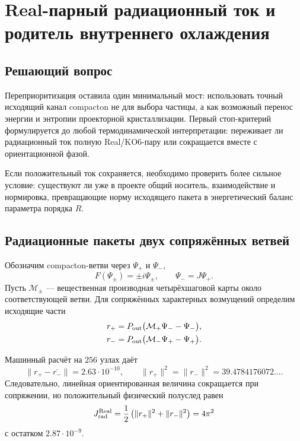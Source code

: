 \chapter{Real-парный радиационный ток и родитель внутреннего охлаждения}
\label{ch:v6-spectral-transition-real-pair-radiative-cooling-parent-gate}

\section{Решающий вопрос}

Переприоритизация оставила один минимальный мост: использовать точный
исходящий канал compacton не для выбора частицы, а как возможный перенос
энергии и энтропии проекторной кристаллизации. Первый стоп-критерий
формулируется до любой термодинамической интерпретации: переживает ли
радиационный ток полную Real/KO6-пару или сокращается вместе с
ориентационной фазой.

Если положительный ток сохраняется, необходимо проверить более сильное
условие: существуют ли уже в проекте общий носитель, взаимодействие и
нормировка, превращающие норму исходящего пакета в энергетический баланс
параметра порядка $R$.

\section{Радиационные пакеты двух сопряжённых ветвей}

Обозначим compacton-ветви через $\Psi_+$ и $\Psi_-$,
\begin{equation}
 F(\Psi_\pm)=\pm i\Psi_\pm,
 \qquad
 \Psi_-=J\Psi_+.
\end{equation}
Пусть $\mathcal M_\pm$ --- вещественная производная четырёхшаговой карты
около соответствующей ветви. Для сопряжённых характерных возмущений
определим исходящие части
\begin{align}
 r_+&=P_{\rm out}\bigl(\mathcal M_+\Psi_- -\Psi_-\bigr),\\
 r_-&=P_{\rm out}\bigl(\mathcal M_-\Psi_+ -\Psi_+\bigr).
 \label{eq:v6-real-pair-radiation-packets}
\end{align}

Машинный расчёт на $256$ узлах даёт
\begin{equation}
 \|r_+-\overline{r_-}\|=2.63\cdot10^{-10},
 \qquad
 \|r_+\|^2=\|r_-\|^2
 =39.4784176072\ldots.
\end{equation}
Следовательно, линейная ориентированная величина сокращается при
сопряжении, но положительный физический полуслед равен
\begin{equation}
 J_{\rm rad}^{\rm Real}
 =\frac12\left(\|r_+\|^2+\|r_-\|^2\right)
 =4\pi^2
 \label{eq:v6-real-pair-positive-radiation-current}
\end{equation}
с остатком $2.87\cdot10^{-9}$.

